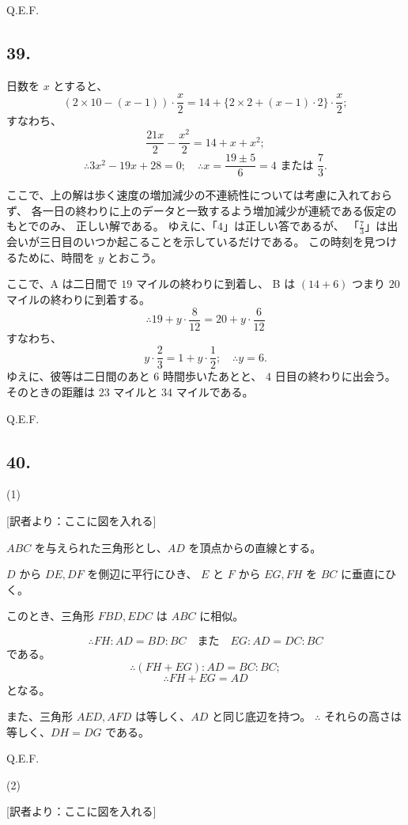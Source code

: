 Q.E.F.

\subsection*{39.}

日数を $x$ とすると、
\[
(2 \times 10 - (x - 1)) \cdot \frac{x}{2}
 = 14 + \{ 2 \times 2 + (x - 1) \cdot 2 \} \cdot \frac{x}{2};
 \]
すなわち、
\[
\frac{21 x}{2} - \frac{x^2}{2} = 14 + x + x^2;
\]
\[
\therefore
3 x^2 - 19x + 28 = 0;
\quad
\therefore
x = \frac{19 \pm 5}{6}
 = 4 \mbox{ または } \frac{7}{3}.
 \]

ここで、上の解は歩く速度の増加減少の不連続性については考慮に入れておらず、
各一日の終わりに上のデータと一致するよう増加減少が連続である仮定のもとでのみ、
正しい解である。
ゆえに、「$4$」は正しい答であるが、
「$\frac{7}{3}$」は出会いが三日目のいつか起こることを示しているだけである。
この時刻を見つけるために、時間を $y$ とおこう。

ここで、A は二日間で $19$ マイルの終わりに到着し、
B は $(14 + 6)$ つまり $20$ マイルの終わりに到着する。
\[
\therefore
 19 + y \cdot \frac{8}{12} = 20 + y \cdot \frac{6}{12}
 \]
すなわち、
\[
y \cdot \frac{2}{3} = 1 + y \cdot \frac{1}{2};
\quad
\therefore
y = 6.
\]
ゆえに、彼等は二日間のあと $6$ 時間歩いたあとと、
$4$ 日目の終わりに出会う。
そのときの距離は $23$ マイルと $34$ マイルである。

Q.E.F.

\subsection*{40.}

(1)

[訳者より：ここに図を入れる] 

$ABC$ を与えられた三角形とし、$AD$ を頂点からの直線とする。

$D$ から $DE, DF$ を側辺に平行にひき、
$E$ と $F$ から $EG, FH$ を $BC$ に垂直にひく。

このとき、三角形 $FBD, EDC$ は $ABC$ に相似。

\[
\therefore
FH: AD = BD : BC
\quad \mbox{また} \quad
EG: AD = DC: BC
\]
である。
\[
\therefore
(FH + EG) : AD = BC: BC;
\]
\[
\therefore
FH + EG = AD
\]
となる。

また、三角形 $AED, AFD$ は等しく、$AD$ と同じ底辺を持つ。
$\therefore$
それらの高さは等しく、$DH = DG$ である。

Q.E.F.

(2)

[訳者より：ここに図を入れる] 

